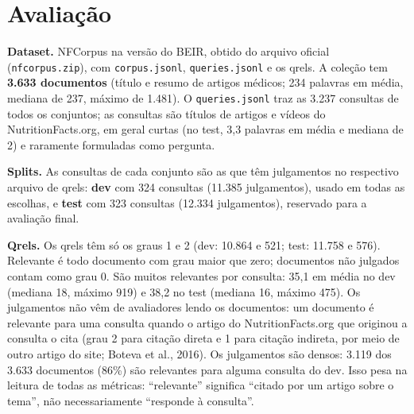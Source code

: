 \documentclass[10pt,a4paper]{article}
\begin{document}
\begin{center}
\end{center}

\section{Avaliação}
\label{sec:avaliacao}

\textbf{Dataset.} NFCorpus na versão do BEIR, obtido do arquivo oficial (\texttt{nfcorpus.zip}), com \texttt{corpus.jsonl}, \texttt{queries.jsonl} e os qrels. A coleção tem \textbf{3.633 documentos} (título e resumo de artigos médicos; 234 palavras em média, mediana de 237, máximo de 1.481). O \texttt{queries.jsonl} traz as 3.237 consultas de todos os conjuntos; as consultas são títulos de artigos e vídeos do NutritionFacts.org, em geral curtas (no test, 3,3 palavras em média e mediana de 2) e raramente formuladas como pergunta.

\textbf{Splits.} As consultas de cada conjunto são as que têm julgamentos no respectivo arquivo de qrels: \textbf{dev} com 324 consultas (11.385 julgamentos), usado em todas as escolhas, e \textbf{test} com 323 consultas (12.334 julgamentos), reservado para a avaliação final.

\textbf{Qrels.} Os qrels têm só os graus 1 e 2 (dev: 10.864 e 521; test: 11.758 e 576). Relevante é todo documento com grau maior que zero; documentos não julgados contam como grau 0. São muitos relevantes por consulta: 35,1 em média no dev (mediana 18, máximo 919) e 38,2 no test (mediana 16, máximo 475). Os julgamentos não vêm de avaliadores lendo os documentos: um documento é relevante para uma consulta quando o artigo do NutritionFacts.org que originou a consulta o cita (grau 2 para citação direta e 1 para citação indireta, por meio de outro artigo do site; Boteva et al., 2016). Os julgamentos são densos: 3.119 dos 3.633 documentos (86\%) são relevantes para alguma consulta do dev. Isso pesa na leitura de todas as métricas: ``relevante'' significa ``citado por um artigo sobre o tema'', não necessariamente ``responde à consulta''.
\end{document}
